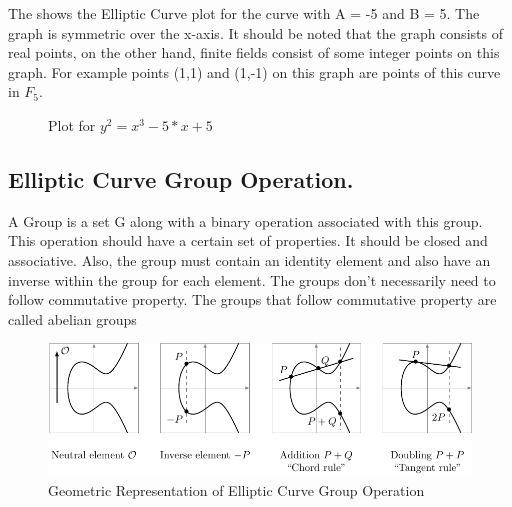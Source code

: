 The  shows the Elliptic Curve plot for the curve with A = -5 and B = 5. The graph is symmetric over the x-axis. It should be noted that the graph consists of real points, on the other hand, finite fields consist of some integer points on this graph. For example points (1,1) and (1,-1) on this graph are points of this curve in $F_5$.


\begin{figure}[!h]
\begin{adjustbox}
{center}
    \end{adjustbox}
      \caption{Plot for $y^2=x^3-5*x+5$}
        \label{fig:plot}

\end{figure}

\subsection{Elliptic Curve Group Operation.} A Group is a set G along with a binary operation associated with this group. This operation should have a certain set of properties. It should be closed and associative. Also, the group must contain an identity element and also have an inverse within the group for each element. The groups don't necessarily need to follow commutative property. The groups that follow commutative property are called abelian groups

\begin{figure}
\includegraphics{ecc/ec_group_operations.pdf}
\caption{Geometric Representation of Elliptic Curve Group Operation}
 \label{fig:oper}
\end{figure}

